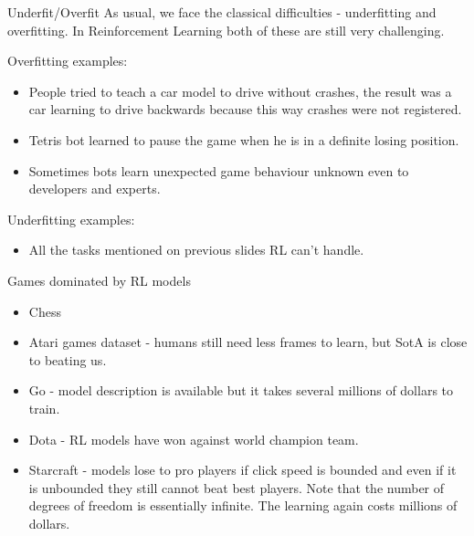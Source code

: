 \documentclass{beamer}
\theoremstyle{remark}
\begin{document}
\begin{frame}{Underfit/Overfit}
    As usual, we face the classical difficulties - underfitting and overfitting. In Reinforcement Learning both of these are still very challenging.
    
    Overfitting examples: 
    \begin{itemize}
        \item People tried to teach a car model to drive without crashes, the result was a car learning to drive backwards because this way crashes were not registered.
        \item Tetris bot learned to pause the game when he is in a definite losing position.
        \item Sometimes bots learn unexpected game behaviour unknown even to developers and experts.
    \end{itemize}
    
    Underfitting examples: 
    \begin{itemize}
        \item All the tasks mentioned on previous slides RL can't handle.
    \end{itemize}
\end{frame}

\begin{frame}{Games dominated by RL models}
    \begin{itemize}
        \item Chess
        \item Atari games dataset - humans still need less frames to learn, but SotA is close to beating us.
        \item Go - model description is available but it takes several millions of dollars to train.
        \item Dota - RL models have won against world champion team. 
        \item Starcraft - models lose to pro players if click speed is bounded and even if it is unbounded they still cannot beat best players. Note that the number of degrees of freedom is essentially infinite. The learning again costs millions of dollars.
    \end{itemize}
\end{frame}
\end{document}
